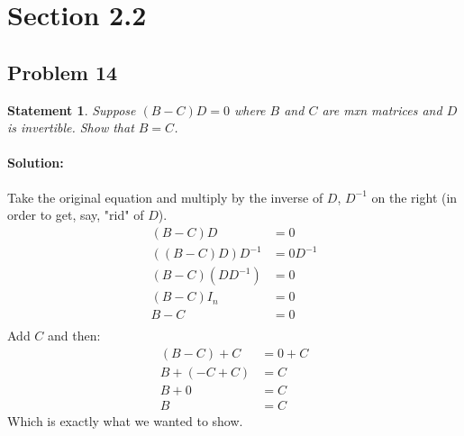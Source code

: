 \documentclass[12pt, letterpaper]{article}
\theoremstyle{statement}
\theoremstyle{statement}
\newtheorem*{atmStat}{Statement}
\newenvironment{Solution}{\noindent\ignorespaces\paragraph{Solution:}}{\hfill \ding{122}\par\noindent}
\begin{document}
    \section*{Section 2.2}
    \subsection*{Problem 14}
    \begin{atmStat}
    Suppose $(B - C)D=0$ where $B$ and $C$ are mxn matrices and $D$ is invertible. Show that $B=C$.
    \end{atmStat}
    \begin{Solution}
    Take the original equation and multiply by the inverse of $D$, $D^{-1}$ on the right (in order to get, say, "rid" of $D$).
    \begin{align*}
        (B - C)D &= 0 \\
        ((B - C)D)D^{-1} &= 0D^{-1} \\
        (B - C)(DD^{-1}) &= 0 \\
        (B - C)I_n &= 0 \\
        B - C &= 0\\
    \end{align*}
    Add $C$ and then:
    \begin{align*}
        (B - C) + C &= 0 + C \\ 
        B + (-C + C) &= C \\
        B + 0 &= C \\
        B &= C
    \end{align*}
    Which is exactly what we wanted to show.
    
    \end{Solution}
\end{document}
